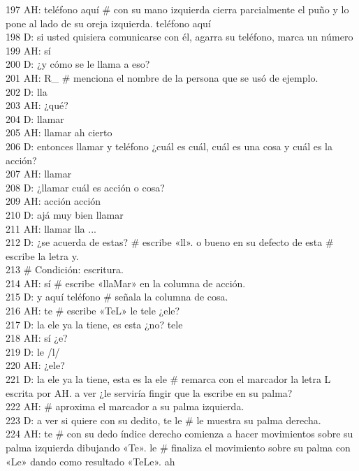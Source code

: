 197 AH: teléfono aquí \# con su mano izquierda cierra parcialmente el puño y lo pone al lado de su oreja izquierda. teléfono aquí\\
198 D: si usted quisiera comunicarse con él, agarra su teléfono, marca un número\\
199 AH: sí\\
200 D: ¿y cómo se le llama a eso?\\
201 AH: R\_ \# menciona el nombre de la persona que se usó de ejemplo.\\
202 D: lla\\
203 AH: ¿qué?\\
204 D: llamar\\
205 AH: llamar ah cierto\\
206 D: entonces llamar y teléfono ¿cuál es cuál, cuál es una cosa y cuál es la acción?\\
207 AH: llamar\\
208 D: ¿llamar cuál es acción o cosa?\\
209 AH: acción acción\\
210 D: ajá muy bien llamar\\
211 AH: llamar lla ...\\
212 D: ¿se acuerda de estas? \# escribe «ll». o bueno en su defecto de esta \# escribe la letra y.\\
213 \# Condición: escritura.\\
214 AH: sí \# escribe «llaMar» en la columna de acción.\\
215 D: y aquí teléfono \# señala la columna de cosa.\\
216 AH: te \# escribe «TeL» le tele ¿ele?\\
217 D: la ele ya la tiene, es esta ¿no? tele\\
218 AH: sí ¿e?\\
219 D: le /l/\\
220 AH: ¿ele?\\
221 D: la ele ya la tiene, esta es la ele \# remarca con el marcador la letra L escrita por AH. a ver ¿le serviría fingir que la escribe en su palma?\\
222 AH: \# aproxima el marcador a su palma izquierda.\\
223 D: a ver si quiere con su dedito, te le \# le muestra su palma derecha.\\
224 AH: te \# con su dedo índice derecho comienza a hacer movimientos sobre su palma izquierda dibujando «Te». le \# finaliza el movimiento sobre su palma con «Le» dando como resultado\label{resulado} «TeLe». ah\\
